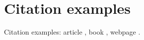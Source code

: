 \section{Citation examples}

Citation examples: article \cite{Beauregard2005}, book \cite{Hicks2006}, webpage \cite{spotcrime,doboszczak}.
